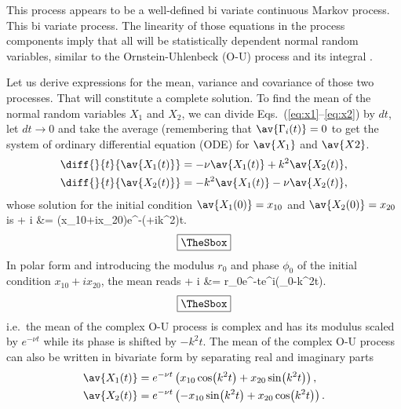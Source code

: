 \documentclass[10pt,a4paper]{article}
\newcommand{\eqs}[2]{Eqs.~(\ref{#1}--\ref{#2})}
\newcommand{\OU}{\renewcommand{\OU}{O-U\xspace}Ornstein-Uhlenbeck (O-U)\xspace}
\newcommand{\ODE}{\renewcommand{\ODE}{ODE\xspace}ordinary differential equation (ODE)\xspace}
\newlength{\mylength}
\newenvironment{falign}%
{\setlength{\fboxsep}{5pt}
\setlength{\fboxrule}{0.5pt}
\setlength{\mylength}{\textwidth}
\addtolength{\mylength}{-2\fboxsep}
\addtolength{\mylength}{-2\fboxrule}
\Sbox
\minipage{\mylength}%
	\setlength{\abovedisplayskip}{-2\lineskip}
	\setlength{\belowdisplayskip}{-2\lineskip}
\align}%
{\endalign\endminipage\endSbox
\[\fbox{\TheSbox}\]}
\begin{document}
This process appears to be a well-defined bi variate continuous Markov process.
This bi variate process. The linearity of those equations in the process
components imply that all will be statistically dependent normal random
variables, similar to the \OU process and its integral
\citep{gillespie:1996a,gillespie:1996b}.

Let us derive expressions for the mean, variance and
covariance of those two processes. That will constitute a complete
solution.
To find the mean of the normal random variables $X_1$ and $X_2$, we can
divide \eqs{eq:x1}{eq:x2} by $dt$, let $dt\rightarrow0$ and take the average
(remembering that $\av{\Gamma_i(t)}=0$ to get the system of \ODE for
$\av{X_1}$ and $\av{X2}$.
\begin{align}
\diff{}{t}{\av{X_1(t)}} &= -\nu\av{X_1(t)} +k^2\av{X_2(t)}, \label{eq:meanx1}\\
\diff{}{t}{\av{X_2(t)}} &= -k^2\av{X_1(t)} -\nu\av{X_2(t)}, \label{eq:meanx2}
\end{align}
whose solution for the initial condition $\av{X_1(0)}=x_{10}$
and $\av{X_2(0)}=x_{20}$ is 
\begin{falign}
 + i  &= (x_{10}+ix_{20})e^{-(\nu +ik^2)t}.
\end{falign}
In polar form and introducing the modulus $r_0$ and phase $\phi_0$ of the
initial condition $x_{10}+ix_{20}$, the mean reads
\begin{falign}
 + i  &= r_0e^{-\nu t}e^{i(\phi_0{-}k^2t)}.
\end{falign}
i.e.\ the mean of the complex \OU process is complex and has its modulus
scaled by $e^{-\nu t}$ while its phase is shifted by ${-}k^2t$. 
The mean of the complex \OU process can also be written
in bivariate form by separating real and imaginary parts
\begin{align}
\av{X_1(t)} &= e^{-\nu t}\left(x_{10}\cos(k^2t)+x_{20}\sin(k^2t)\right),\\
\av{X_2(t)} &= e^{-\nu t}\left(-x_{10}\sin(k^2t)+x_{20}\cos(k^2t)\right).
\end{align}
\end{document}

